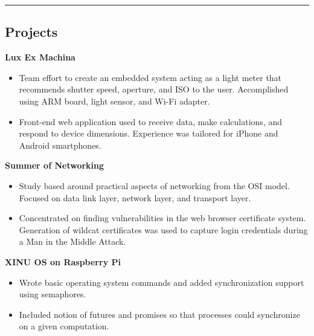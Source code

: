 \documentclass[12pt,letterpaper]{article}
\begin{document}
\noindent\rule{7.5in}{0.4pt}

\subsection*{Projects}

\noindent\textbf{Lux Ex Machina}
  \begin{itemize}

    \item Team effort to create an embedded system acting as a light meter that recommends shutter speed,
    aperture, and ISO to the user. Accomplished using ARM board, light sensor, and
    Wi-Fi adapter.

    \item Front-end web application used to receive data, make calculations, and
    respond to device dimensions. Experience was tailored for iPhone and Android smartphones.

  \end{itemize}

\noindent\textbf{Summer of Networking}
  \begin{itemize}

    \item Study based around practical aspects of networking from the OSI model.
    Focused on data link layer, network layer, and transport layer.

    \item Concentrated on finding vulnerabilities in the web browser certificate system.
    Generation of wildcat certificates was used to capture login credentials during a Man in the Middle Attack.

  \end{itemize}

\noindent\textbf{XINU OS on Raspberry Pi}
  \begin{itemize}

    \item Wrote basic operating system commands and added synchronization support using semaphores.

    \item Included notion of futures and promises so that processes could synchronize on a given computation.

  \end{itemize}




\end{document}
